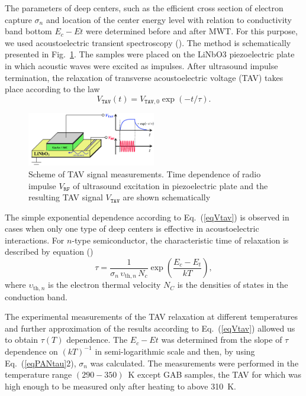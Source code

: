 \documentclass[final,3p,times,twocolumn,authoryear]{elsarticle}
\begin{document}
The parameters of deep centers, such as the efficient cross section of electron capture $\sigma_n$
and location of the center energy level with relation to conductivity band bottom $E_c-Et$ were determined before and after MWT.
For this purpose, we used acoustoelectric transient spectroscopy (\cite{OstrovPAN,OlikhSSC,PANnewEn,OstrovskiiSST}).
The method is schematically presented in Fig.~\ref{figTAV}.
The samples were placed on the LiNbO3 piezoelectric plate in which acoustic waves were excited as impulses.
After ultrasound impulse termination, the relaxation of transverse acoustoelectric voltage (TAV) takes place according to the law
\begin{equation}\label{eqVtav}
  V_\mathtt{TAV}(t)=V_{\mathtt{TAV},0}\exp(-t/\tau).
\end{equation}



\begin{figure}
\center
\includegraphics[width=0.5\textwidth]{fig2}
\caption{\label{figTAV}
Scheme of TAV signal  measurements.
Time dependence of radio impulse $V_\mathtt{RF}$ of ultrasound excitation in piezoelectric plate and the resulting TAV signal $V_\mathtt{TAV}$ are shown schematically
}%
\end{figure}


The simple exponential dependence according to Eq.~(\ref{eqVtav}) is observed in cases when only one type of deep centers is effective in acoustoelectric interactions.
For $n$-type semiconductor, the characteristic time of relaxation is described by equation (\cite{OstrovPAN,OstrovskiiSST})
\begin{equation}\label{eqPANtau}
  \tau=\frac{1}{\sigma_n\,\upsilon_{\mathrm{th},n}\,N_c}\exp\left(\frac{E_c-E_t}{kT}\right),
\end{equation}
where
$\upsilon_{\mathrm{th},n}$ is the electron thermal velocity
$N_C$ is the densities of states in the conduction band.


The experimental measurements of the TAV relaxation at different temperatures and further approximation of the results according to Eq.~(\ref{eqVtav})
allowed us to obtain $\tau(T)$ dependence.
The $E_c-Et$ was determined from the slope of $\tau$ dependence on $(kT)^{-1}$ in semi-logarithmic scale
and then, by using Eq.~(\ref{eqPANtau}2), $\sigma_n$ was calculated.
The measurements were performed in the temperature range $(290-350)$~K except GAB samples,
the TAV for which was high enough to be measured only after heating to above 310~K.
\end{document}
